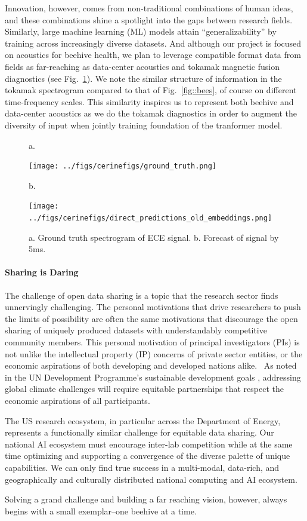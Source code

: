 Innovation, however, comes from non-traditional combinations of human ideas, and these combinations shine a spotlight into the gaps between research fields. 
Similarly, large machine learning (ML) models attain ``generalizability'' by training across increasingly diverse datasets. 
And although our project is focused on acoustics for beehive health, we plan to leverage compatible format data from fields as far-reaching as data-center acoustics and tokamak magnetic fusion diagnostics (see Fig.~\ref{fig::spectrograms}).
We note the similar structure of information in the tokamak spectrogram compared to that of Fig.~\ref{fig::bees}, of course on different time-frequency scales.
This similarity inspires us to represent both beehive and data-center acoustics as we do the tokamak diagnostics in order to augment the diversity of input when jointly training foundation of the tranformer model.

\begin{figure}
	\raggedright{a.}\\
	\centerline{\texttt{[image: ../figs/cerinefigs/ground\_truth.png]}}
	\raggedright{b.}\\
	\centerline{\texttt{[image: ../figs/cerinefigs/direct\_predictions\_old\_embeddings.png]}}
	\caption{\label{fig::spectrograms}
		a. Ground truth spectrogram of ECE signal. b. Forecast of signal by 5ms.}
\end{figure}

\paragraph{Sharing is Daring}
The challenge of open data sharing is a topic that the research sector finds unnervingly challenging. 
The personal motivations that drive researchers to push the limits of possibility are often the same motivations that discourage the open sharing of uniquely produced datasets with understandably competitive community members. 
This personal motivation of principal investigators (PIs) is not unlike the intellectual property (IP) concerns of private sector entities, or the economic aspirations of both developing and developed nations alike.  
As noted in the UN Development Programme's sustainable development goals \cite{SDGs}, addressing global climate challenges will require equitable partnerships that respect the economic aspirations of all participants.

The US research ecosystem, in particular across the Department of Energy, represents a functionally similar challenge for equitable data sharing.
Our national AI ecosystem must encourage inter-lab competition while at the same time optimizing and supporting a convergence of the diverse palette of unique capabilities.
We can only find true success in a multi-modal, data-rich, and geographically and culturally distributed national computing and AI ecosystem. 

Solving a grand challenge and building a far reaching vision, however, always begins with a small exemplar--one beehive at a time.




